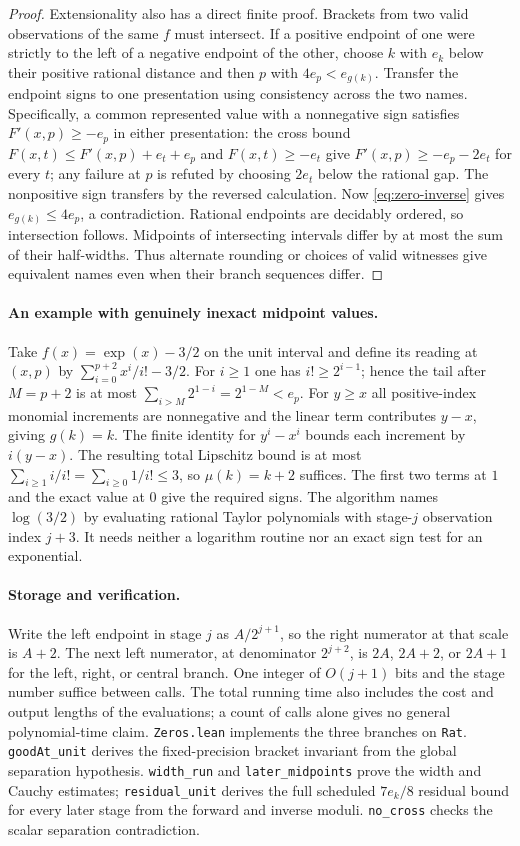 \begin{proof}
Extensionality also has a direct finite proof. Brackets from two valid
observations of the same $f$ must intersect. If a positive endpoint of one
were strictly to the left of a negative endpoint of the other, choose $k$
with $e_k$ below their positive rational distance and then $p$ with
$4e_p<e_{g(k)}$. Transfer the endpoint signs to one presentation using
consistency across the two names. Specifically, a common represented value
with a nonnegative sign satisfies $F'(x,p)\ge-e_p$ in either presentation:
the cross bound $F(x,t)\le F'(x,p)+e_t+e_p$ and $F(x,t)\ge-e_t$
give $F'(x,p)\ge-e_p-2e_t$ for every $t$; any failure at $p$ is
refuted by choosing $2e_t$ below the rational gap. The nonpositive sign transfers
by the reversed calculation. Now \eqref{eq:zero-inverse} gives
$e_{g(k)}\le4e_p$, a contradiction. Rational endpoints are decidably
ordered, so intersection follows. Midpoints of intersecting intervals
differ by at most the sum of their half-widths. Thus alternate rounding or
choices of valid witnesses give equivalent names even when their branch
sequences differ.
\end{proof}

\paragraph{An example with genuinely inexact midpoint values.}
Take $f(x)=\exp(x)-3/2$ on the unit interval and define its reading at
$(x,p)$ by $\sum_{i=0}^{p+2}x^i/i!-3/2$. For $i\ge1$ one has
$i!\ge2^{i-1}$; hence the tail after $M=p+2$ is at most
$\sum_{i>M}2^{1-i}=2^{1-M}<e_p$. For $y\ge x$ all positive-index
monomial increments are nonnegative and the linear term contributes
$y-x$, giving $g(k)=k$. The finite identity for $y^i-x^i$ bounds each
increment by $i(y-x)$. The resulting total Lipschitz bound is at most
$\sum_{i\ge1}i/i!=\sum_{i\ge0}1/i!\le3$, so $\mu(k)=k+2$ suffices.
The first two terms at $1$ and the exact value at $0$ give the required
signs. The algorithm names $\log(3/2)$ by evaluating rational Taylor
polynomials with stage-$j$ observation index $j+3$. It needs neither a
logarithm routine nor an exact sign test for an exponential.

\paragraph{Storage and verification.}
Write the left endpoint in stage $j$ as $A/2^{j+1}$, so the right numerator
at that scale is $A+2$. The next left numerator, at denominator $2^{j+2}$,
is $2A$, $2A+2$, or $2A+1$ for the left, right, or central branch.
One integer of $O(j+1)$ bits and the stage number suffice between calls.
The total running time also includes the cost and output lengths of the
evaluations; a count of calls alone gives no general polynomial-time claim.
\texttt{Zeros.lean} implements the three branches on \texttt{Rat}.
\texttt{goodAt\_unit} derives the fixed-precision bracket invariant from
the global separation hypothesis. \texttt{width\_run} and
\texttt{later\_midpoints} prove the width and Cauchy estimates;
\texttt{residual\_unit} derives the full scheduled $7e_k/8$ residual bound
for every later stage from the forward and inverse moduli.
\texttt{no\_cross} checks the scalar separation contradiction.

